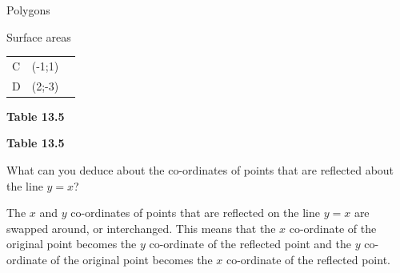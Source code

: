 \begin{exercises}{Polygons}
\begin{exercises}{Surface areas }
\begin{table}[H]
\begin{center}
\begin{xtabular}[t]{|l|l|l|}
    
        C &
    
    
        (-1;1) &
    
    
     \tabularnewline{}
    
    
        D &
    
    
        (2;-3) &
    
    
     \tabularnewline{}
    \end{xtabular}
      \end{center}
    \begin{center}{\small\bfseries Table 13.5}\end{center}
    \begin{caption}{\small\bfseries Table 13.5}\end{caption}
\end{table}
      
    \par
  
          
          \label{m39358*id72055}What can you deduce about the co-ordinates of points that are reflected about the line $y=x$? \par 

          \label{m39358*id72080}The $x$ and $y$ co-ordinates of points that are reflected on the line $y=x$ are swapped around, or interchanged. This means that the $x$ co-ordinate of the original point becomes the $y$ co-ordinate of the reflected point and the $y$ co-ordinate of the original point becomes the $x$ co-ordinate of the reflected point.\par 
          
    \setcounter{subfigure}{0}



\end{exercises}
\end{exercises}
